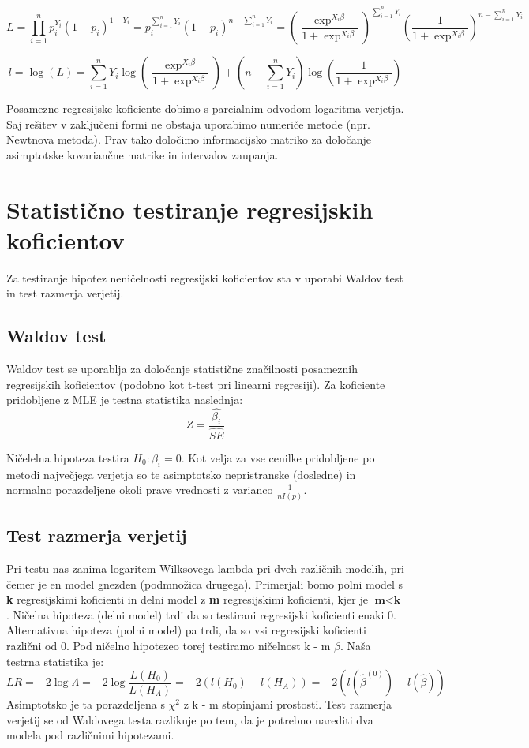 \documentclass[letterpaper,11pt]{article}
\begin{document}
$$L = \prod_{i=1}^n p_i^{Y_i}(1-p_i)^{1-Y_i}=p_i^{\sum_{i=1}^n Y_i}(1-p_i)^{n-\sum_{i=1}^n Y_i} = 
(\frac{\exp^{X_i \beta}}{1+\exp^{X_i \beta}})^{\sum_{i=1}^n Y_i}(\frac{1}{1+\exp^{X_i \beta}})^{n-\sum_{i=1}^n Y_i}$$

$$l = \log{(L)} = \sum_{i=1}^n Y_i \log{(\frac{\exp^{X_i \beta}}{1+\exp^{X_i \beta}})} + (n-\sum_{i=1}^n Y_i)\log{(\frac{1}{1+\exp^{X_i \beta}})}$$

\noindent Posamezne regresijske koficiente dobimo s parcialnim odvodom logaritma verjetja. Saj rešitev v zaključeni formi ne obstaja uporabimo numeriče metode (npr. Newtnova metoda). Prav tako določimo informacijsko matriko za določanje asimptotske kovariančne matrike in intervalov zaupanja.


\section{Statistično testiranje regresijskih koficientov}
Za testiranje hipotez neničelnosti regresijski koficientov sta v uporabi Waldov test in  test razmerja verjetij.

\subsection{Waldov test}
Waldov test se uporablja za določanje statistične značilnosti posameznih regresijskih koficientov (podobno kot t-test pri linearni regresiji). Za koficiente pridobljene z MLE je testna statistika naslednja:
$$Z = \frac{\hat{\beta_i}}{\hat{SE}}$$

\noindent Ničelelna hipoteza testira $H_0: \beta_i =0$. Kot velja za vse cenilke pridobljene po metodi največjega verjetja so te asimptotsko nepristranske (dosledne) in normalno porazdeljene okoli prave vrednosti z varianco $\frac{1}{nI(p)}$.

\subsection{Test razmerja verjetij}
Pri testu nas zanima logaritem Wilksovega lambda pri dveh različnih modelih, pri čemer je en model gnezden (podmnožica drugega). Primerjali bomo polni model s \textbf{k} regresijskimi koficienti in delni model z \textbf{m} regresijskimi koficienti, kjer je $\textbf{m} < \textbf{k}$. Ničelna hipoteza (delni model) trdi da so testirani regresijski koficienti enaki 0. Alternativna hipoteza (polni model) pa trdi, da so vsi regresijski koficienti različni od 0. Pod ničelno hipotezeo torej testiramo ničelnost k - m $\beta$. Naša testrna statistika je:
$$LR = -2 \log{\Lambda} = -2 \log{\frac{L(H_0)}{L(H_A)}} = -2(l(H_0) - l(H_A))=-2(l(\hat{\beta}^{(0)}) - l(\hat{\beta}))$$
Asimptotsko je ta porazdeljena s $\chi^2$ z k - m stopinjami prostosti. Test razmerja verjetij se od Waldovega testa razlikuje po tem, da je potrebno narediti dva modela pod različnimi hipotezami.
\end{document}
